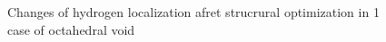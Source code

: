 \begin{figure}[ht]
\begin{minipage}[ht]{0.49\linewidth}
\end{minipage}
\hfill
\begin{minipage}[ht]{0.49\linewidth}
\end{minipage}
\caption{Changes of hydrogen localization afret strucrural optimization in 1 case of octahedral void}
\label{ris:oct1}
\end{figure}

